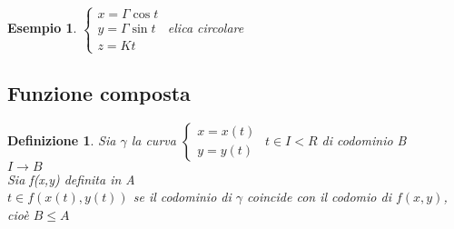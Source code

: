 \documentclass{book}
\newtheorem{defi}{Definizione}
\newtheorem{esempio}{Esempio}
\begin{document}
\begin{esempio}
  $\begin{cases} x = \Gamma \cos t \\ y = \Gamma \sin t \\ z=Kt \end{cases}$ elica circolare 
\end{esempio}
\subsection{Funzione composta}
\begin{defi}
  Sia $\gamma$ la curva $\begin{cases} x=x(t) \\ y=y(t)\end{cases}$ $t\in I < R$ di codominio B\\
  $I\to B$\\
  Sia f(x,y) definita in A \\
  $t\in f(x(t),y(t))$ se il codominio di $\gamma$ coincide con il codomio di $f(x,y)$, cioè
  $B \leq A$
\end{defi}

\printindex    
\end{document}
